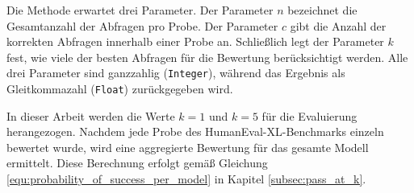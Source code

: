 Die Methode erwartet drei Parameter. Der Parameter $n$ bezeichnet die Gesamtanzahl der Abfragen pro Probe. Der Parameter $c$ gibt die Anzahl der korrekten Abfragen innerhalb einer Probe an. Schließlich legt der Parameter $k$ fest, wie viele der besten Abfragen für die Bewertung berücksichtigt werden. Alle drei Parameter sind ganzzahlig (\texttt{Integer}), während das Ergebnis als Gleitkommazahl (\texttt{Float}) zurückgegeben wird.  

In dieser Arbeit werden die Werte $k=1$ und $k=5$ für die Evaluierung herangezogen. Nachdem jede Probe des HumanEval-XL-Benchmarks einzeln bewertet wurde, wird eine aggregierte Bewertung für das gesamte Modell ermittelt. Diese Berechnung erfolgt gemäß Gleichung \ref{equ:probability_of_success_per_model} in Kapitel \ref{subsec:pass_at_k}.  






